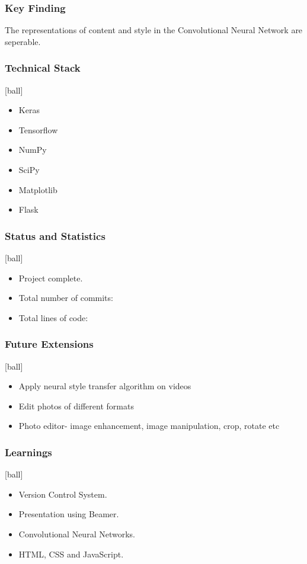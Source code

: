 \documentclass[14pt]{beamer}
\begin{document}
\begin{frame}
		\frametitle{Key Finding}
		The representations of content and style in the Convolutional Neural Network are seperable.
\end{frame}

\begin{frame}
		\frametitle{Technical Stack}
		\begin{itemize}
		\item Keras 
        \item Tensorflow
		\item NumPy
		\item SciPy
        \item Matplotlib
		\item Flask  
		\end{itemize}
\end{frame}

\begin{frame}
		\frametitle{Status and Statistics}
		\begin{itemize}
		\item Project complete.
		\item Total number of commits: 
        \item Total lines of code:
		\end{itemize}
\end{frame}


\begin{frame}
    \frametitle{Future Extensions}
    [ball]
    \begin{itemize}
    \item Apply neural style transfer algorithm on videos
    \item Edit photos of different formats
    \item Photo editor- image enhancement, image manipulation, crop, rotate etc
    \end{itemize}
\end{frame}

\begin{frame}
		\frametitle{Learnings}
        \begin{itemize}
		\item Version Control System.
		\item Presentation using Beamer.
		\item Convolutional Neural Networks.
        \item HTML, CSS and JavaScript.
		\end{itemize}
\end{frame}
\end{document}
